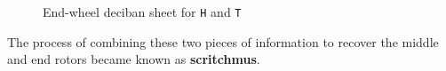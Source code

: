 \begin{itemize}
	      \begin{figure}[H]
		      \begin{center}
		      \end{center}

		      \caption{End-wheel deciban sheet for \texttt{H} and \texttt{T}}
		      \label{fig:deciban_sheet}
	      \end{figure}
\end{itemize}
The process of combining these two pieces of information to recover the middle and end rotors became known as {\bf{scritchmus}}.

